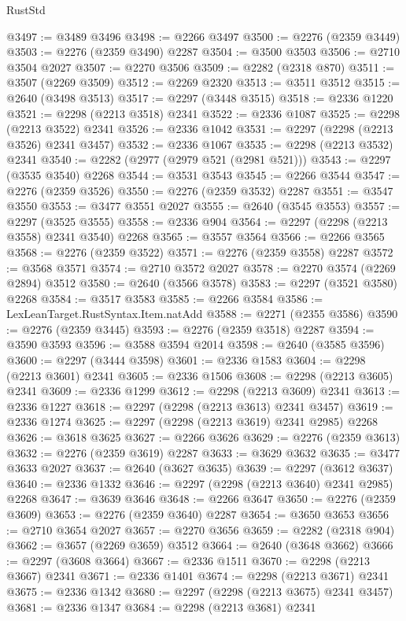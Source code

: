 \begin{lexlean}{RustStd}
\begin{coremodule}
@3497 := @3489 @3496
@3498 := @2266 @3497
@3500 := @2276 (@2359 @3449)
@3503 := @2276 (@2359 @3490) @2287
@3504 := @3500 @3503
@3506 := @2710 @3504 @2027
@3507 := @2270 @3506
@3509 := @2282 (@2318 @870)
@3511 := @3507 (@2269 @3509)
@3512 := @2269 @2320
@3513 := @3511 @3512
@3515 := @2640 (@3498 @3513)
@3517 := @2297 (@3448 @3515)
@3518 := @2336 @1220
@3521 := @2298 (@2213 @3518) @2341
@3522 := @2336 @1087
@3525 := @2298 (@2213 @3522) @2341
@3526 := @2336 @1042
@3531 := @2297 (@2298 (@2213 @3526) @2341 @3457)
@3532 := @2336 @1067
@3535 := @2298 (@2213 @3532) @2341
@3540 := @2282 (@2977 (@2979 @521 (@2981 @521)))
@3543 := @2297 (@3535 @3540) @2268
@3544 := @3531 @3543
@3545 := @2266 @3544
@3547 := @2276 (@2359 @3526)
@3550 := @2276 (@2359 @3532) @2287
@3551 := @3547 @3550
@3553 := @3477 @3551 @2027
@3555 := @2640 (@3545 @3553)
@3557 := @2297 (@3525 @3555)
@3558 := @2336 @904
@3564 := @2297 (@2298 (@2213 @3558) @2341 @3540) @2268
@3565 := @3557 @3564
@3566 := @2266 @3565
@3568 := @2276 (@2359 @3522)
@3571 := @2276 (@2359 @3558) @2287
@3572 := @3568 @3571
@3574 := @2710 @3572 @2027
@3578 := @2270 @3574 (@2269 @2894) @3512
@3580 := @2640 (@3566 @3578)
@3583 := @2297 (@3521 @3580) @2268
@3584 := @3517 @3583
@3585 := @2266 @3584
@3586 := LexLeanTarget.RustSyntax.Item.natAdd
@3588 := @2271 (@2355 @3586)
@3590 := @2276 (@2359 @3445)
@3593 := @2276 (@2359 @3518) @2287
@3594 := @3590 @3593
@3596 := @3588 @3594 @2014
@3598 := @2640 (@3585 @3596)
@3600 := @2297 (@3444 @3598)
@3601 := @2336 @1583
@3604 := @2298 (@2213 @3601) @2341
@3605 := @2336 @1506
@3608 := @2298 (@2213 @3605) @2341
@3609 := @2336 @1299
@3612 := @2298 (@2213 @3609) @2341
@3613 := @2336 @1227
@3618 := @2297 (@2298 (@2213 @3613) @2341 @3457)
@3619 := @2336 @1274
@3625 := @2297 (@2298 (@2213 @3619) @2341 @2985) @2268
@3626 := @3618 @3625
@3627 := @2266 @3626
@3629 := @2276 (@2359 @3613)
@3632 := @2276 (@2359 @3619) @2287
@3633 := @3629 @3632
@3635 := @3477 @3633 @2027
@3637 := @2640 (@3627 @3635)
@3639 := @2297 (@3612 @3637)
@3640 := @2336 @1332
@3646 := @2297 (@2298 (@2213 @3640) @2341 @2985) @2268
@3647 := @3639 @3646
@3648 := @2266 @3647
@3650 := @2276 (@2359 @3609)
@3653 := @2276 (@2359 @3640) @2287
@3654 := @3650 @3653
@3656 := @2710 @3654 @2027
@3657 := @2270 @3656
@3659 := @2282 (@2318 @904)
@3662 := @3657 (@2269 @3659) @3512
@3664 := @2640 (@3648 @3662)
@3666 := @2297 (@3608 @3664)
@3667 := @2336 @1511
@3670 := @2298 (@2213 @3667) @2341
@3671 := @2336 @1401
@3674 := @2298 (@2213 @3671) @2341
@3675 := @2336 @1342
@3680 := @2297 (@2298 (@2213 @3675) @2341 @3457)
@3681 := @2336 @1347
@3684 := @2298 (@2213 @3681) @2341

\end{coremodule}
\end{lexlean}
